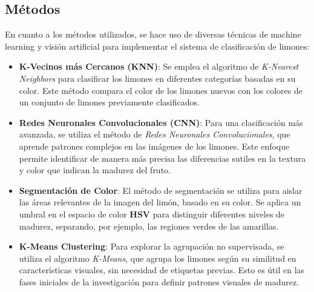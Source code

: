 \subsection{Métodos}

En cuanto a los métodos utilizados, se hace uso de diversas técnicas de machine learning y visión artificial para implementar el sistema de clasificación de limones:

\begin{itemize}
    \item \textbf{K-Vecinos más Cercanos (KNN)}: Se emplea el algoritmo de \textit{K-Nearest Neighbors} para clasificar los limones en diferentes categorías basadas en su color. Este método compara el color de los limones nuevos con los colores de un conjunto de limones previamente clasificados.
    
    \item \textbf{Redes Neuronales Convolucionales (CNN)}: Para una clasificación más avanzada, se utiliza el método de \textit{Redes Neuronales Convolucionales}, que aprende patrones complejos en las imágenes de los limones. Este enfoque permite identificar de manera más precisa las diferencias sutiles en la textura y color que indican la madurez del fruto.
    
    \item \textbf{Segmentación de Color}: El método de segmentación se utiliza para aislar las áreas relevantes de la imagen del limón, basado en su color. Se aplica un umbral en el espacio de color \textbf{HSV} para distinguir diferentes niveles de madurez, separando, por ejemplo, las regiones verdes de las amarillas.
    
    \item \textbf{K-Means Clustering}: Para explorar la agrupación no supervisada, se utiliza el algoritmo \textit{K-Means}, que agrupa los limones según su similitud en características visuales, sin necesidad de etiquetas previas. Esto es útil en las fases iniciales de la investigación para definir patrones visuales de madurez.
\end{itemize}


